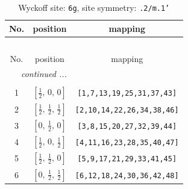 \documentclass[fleqn,8pt]{jsarticle}
\begin{document}
\renewcommand{\arraystretch}{1.2}
\begin{longtable}{ccc}
\caption{Wyckoff site: {\tt 6g}, site symmetry: {\tt .2/m.1'}}
 \\
 \hline \hline
No. & position & mapping \\ \hline \endfirsthead

\multicolumn{2}{l}{\tablename\ \thetable{}} \\
 \hline \hline
No. & position & mapping \\ \hline \endhead

 \hline \hline
\multicolumn{2}{r}{\footnotesize\it continued ...} \\ \endfoot

 \hline \hline
\multicolumn{2}{r}{} \\ \endlastfoot

1 & $\left[ \frac{1}{2},\, 0,\, 0 \right]$ & {\tt [1,7,13,19,25,31,37,43]} \\ \hline
2 & $\left[ \frac{1}{2},\, \frac{1}{2},\, \frac{1}{2} \right]$ & {\tt [2,10,14,22,26,34,38,46]} \\ \hline
3 & $\left[ 0,\, \frac{1}{2},\, 0 \right]$ & {\tt [3,8,15,20,27,32,39,44]} \\ \hline
4 & $\left[ \frac{1}{2},\, 0,\, \frac{1}{2} \right]$ & {\tt [4,11,16,23,28,35,40,47]} \\ \hline
5 & $\left[ \frac{1}{2},\, \frac{1}{2},\, 0 \right]$ & {\tt [5,9,17,21,29,33,41,45]} \\ \hline
6 & $\left[ 0,\, \frac{1}{2},\, \frac{1}{2} \right]$ & {\tt [6,12,18,24,30,36,42,48]} \\
\end{longtable}
\renewcommand{\arraystretch}{1.2}
\end{document}
